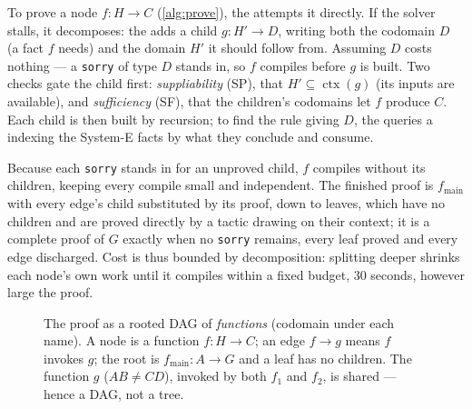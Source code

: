 \documentclass[letterpaper]{article} %
\begin{document}
To prove a node $f\colon H \to C$ (\cref{alg:prove}), the \llm attempts it directly. If the solver stalls, it decomposes: the \llm adds a child $g\colon H' \to D$, writing both the codomain $D$ (a fact $f$ needs) and the domain $H'$ it should follow from. Assuming $D$ costs nothing --- a \texttt{sorry} of type $D$ stands in, so $f$ compiles before $g$ is built. Two \script checks gate the child first: \emph{suppliability} (SP), that $H' \subseteq \operatorname{ctx}(g)$ (its inputs are available), and \emph{sufficiency} (SF), that the children's codomains let $f$ produce $C$. Each child is then built by recursion; to find the rule giving $D$, the \llm queries a \script indexing the System-E facts by what they conclude and consume.

Because each \texttt{sorry} stands in for an unproved child, $f$ compiles without its children, keeping every compile small and independent. The finished proof is $f_{\mathrm{main}}$ with every edge's child substituted by its proof, down to leaves, which have no children and are proved directly by a tactic drawing on their context; it is a complete proof of $G$ exactly when no \texttt{sorry} remains, every leaf proved and every edge discharged. Cost is thus bounded by decomposition: splitting deeper shrinks each node's own work until it compiles within a fixed budget, 30 seconds, however large the proof.

\begin{figure}[t]
\centering
{}
\caption{The proof as a rooted DAG of \emph{functions} (codomain under each name). A node is a function $f\colon H \to C$; an edge $f \to g$ means $f$ invokes $g$; the root is $f_{\mathrm{main}}\colon A \to G$ and a leaf has no children. The function $g$ ($AB \neq CD$), invoked by both $f_1$ and $f_2$, is shared --- hence a DAG, not a tree.}
\label{fig:dag}
\end{figure}
\end{document}
